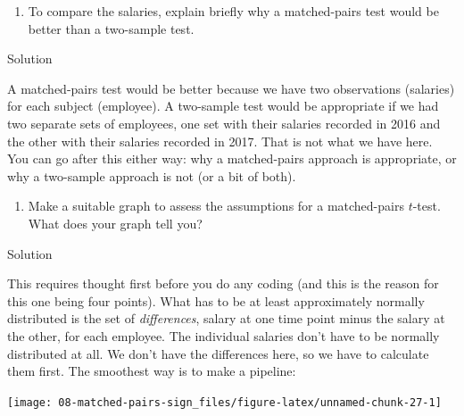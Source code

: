 \documentclass[]{tufte-book}
\newenvironment{Shaded}{}{}
\newcommand{\DataTypeTok}[1]{\textcolor[rgb]{0.56,0.13,0.00}{#1}}
\newcommand{\KeywordTok}[1]{\textcolor[rgb]{0.00,0.44,0.13}{\textbf{#1}}}
\newcommand{\NormalTok}[1]{#1}
\newcommand{\OperatorTok}[1]{\textcolor[rgb]{0.40,0.40,0.40}{#1}}
\newcommand{\StringTok}[1]{\textcolor[rgb]{0.25,0.44,0.63}{#1}}
\providecommand{\tightlist}{%
  \setlength{\itemsep}{0pt}\setlength{\parskip}{0pt}}
\theoremstyle{definition}
\theoremstyle{definition}
\theoremstyle{definition}
\theoremstyle{remark}
\begin{document}
\begin{enumerate}
\def\labelenumi{(\alph{enumi})}
\setcounter{enumi}{1}
\tightlist
\item
  To compare the salaries, explain briefly why a matched-pairs test
  would be better than a two-sample test.
\end{enumerate}

Solution

A matched-pairs test would be better because we have two observations
(salaries) for each subject (employee). A two-sample test would be
appropriate if we had two separate sets of employees, one set with their
salaries recorded in 2016 and the other with their salaries recorded in
2017. That is not what we have here. You can go after this either way:
why a matched-pairs approach is appropriate, or why a two-sample
approach is not (or a bit of both).

\begin{enumerate}
\def\labelenumi{(\alph{enumi})}
\setcounter{enumi}{2}
\tightlist
\item
  Make a suitable graph to assess the assumptions for a matched-pairs
  \(t\)-test. What does your graph tell you?
\end{enumerate}

Solution

This requires thought first before you do any coding (and this is the
reason for this one being four points). What has to be at least
approximately normally distributed is the set of \emph{differences},
salary at one time point minus the salary at the other, for each
employee. The individual salaries don't have to be normally distributed
at all. We don't have the differences here, so we have to calculate them
first. The smoothest way is to make a pipeline:

\begin{Shaded}
\end{Shaded}

\texttt{[image: 08-matched-pairs-sign\_files/figure-latex/unnamed-chunk-27-1]}
\end{document}
